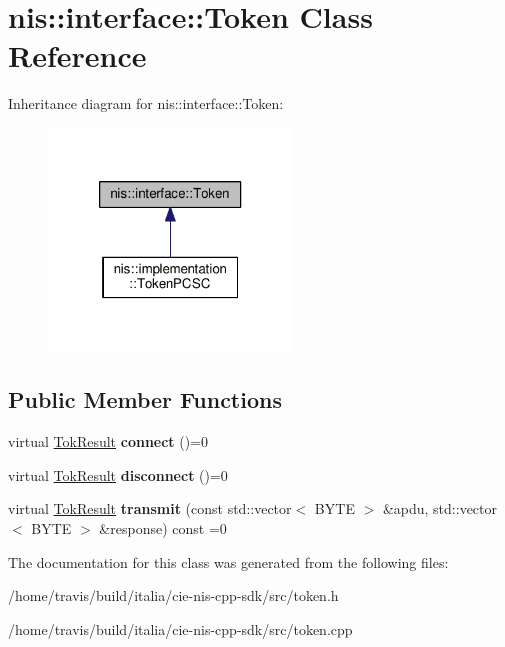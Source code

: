 \hypertarget{classnis_1_1interface_1_1Token}{\section{nis\-:\-:interface\-:\-:Token Class Reference}
\label{classnis_1_1interface_1_1Token}
}


Inheritance diagram for nis\-:\-:interface\-:\-:Token\-:
\nopagebreak
\begin{figure}[H]
\begin{center}
\leavevmode
\includegraphics[width=184pt]{classnis_1_1interface_1_1Token__inherit__graph}
\end{center}
\end{figure}
\subsection*{Public Member Functions}
\begin{DoxyCompactItemize}
\item 
\hypertarget{classnis_1_1interface_1_1Token_aaf1c3de8b5eb45c9b10e4a1b580354d4}{virtual \hyperlink{nis__types_8h_a6ef53483e8ce2f8bc58bd1f75b3d0b38}{Tok\-Result} {\bfseries connect} ()=0}\label{classnis_1_1interface_1_1Token_aaf1c3de8b5eb45c9b10e4a1b580354d4}

\item 
\hypertarget{classnis_1_1interface_1_1Token_a27780784790d95f9724c256175561fea}{virtual \hyperlink{nis__types_8h_a6ef53483e8ce2f8bc58bd1f75b3d0b38}{Tok\-Result} {\bfseries disconnect} ()=0}\label{classnis_1_1interface_1_1Token_a27780784790d95f9724c256175561fea}

\item 
\hypertarget{classnis_1_1interface_1_1Token_ad81a57e70235b95cc404d20814f2e79d}{virtual \hyperlink{nis__types_8h_a6ef53483e8ce2f8bc58bd1f75b3d0b38}{Tok\-Result} {\bfseries transmit} (const std\-::vector$<$ B\-Y\-T\-E $>$ \&apdu, std\-::vector$<$ B\-Y\-T\-E $>$ \&response) const =0}\label{classnis_1_1interface_1_1Token_ad81a57e70235b95cc404d20814f2e79d}

\end{DoxyCompactItemize}


The documentation for this class was generated from the following files\-:\begin{DoxyCompactItemize}
\item 
/home/travis/build/italia/cie-\/nis-\/cpp-\/sdk/src/token.\-h\item 
/home/travis/build/italia/cie-\/nis-\/cpp-\/sdk/src/token.\-cpp\end{DoxyCompactItemize}
